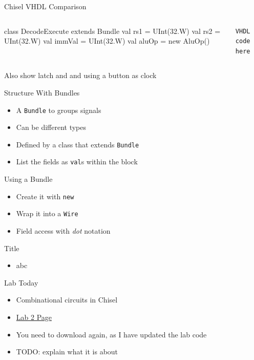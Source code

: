 \documentclass[xcolor=pdflatex,dvipsnames,table]{beamer}
\newcommand{\code}[1]{{\texttt{#1}}}
\begin{document}
\begin{frame}[fragile]{Chisel VHDL Comparison}
\begin{columns}
\begin{chisel}
class DecodeExecute extends Bundle {
  val rs1 = UInt(32.W)
  val rs2 = UInt(32.W)
  val immVal = UInt(32.W)
  val aluOp = new AluOp()
}
\end{chisel}
\begin{verbatim}
VHDL code here
\end{verbatim}
\end{columns}
Also show latch and and using a button as clock
\end{frame}

\begin{frame}[fragile]{Structure With Bundles}
\begin{itemize}
\item A \code{Bundle} to groups signals
\item Can be different types
\item Defined by a class that extends \code{Bundle}
\item List the fields as \code{val}s within the block
\end{itemize}
\end{frame}

\begin{frame}[fragile]{Using a Bundle}
\begin{itemize}
\item Create it with \code{new}
\item Wrap it into a \code{Wire}
\item Field access with \emph{dot} notation
\end{itemize}
\end{frame}



\begin{frame}[fragile]{Title}
\begin{itemize}
\item abc
\end{itemize}
\end{frame}

\begin{frame}[fragile]{Lab Today}
\begin{itemize}
\item Combinational circuits in Chisel
\item \href{https://github.com/schoeberl/chisel-lab/tree/master/lab2}{Lab 2 Page}
\item You need to download again, as I have updated the lab code
\item TODO: explain what it is about
\end{itemize}
\end{frame}
\end{document}
